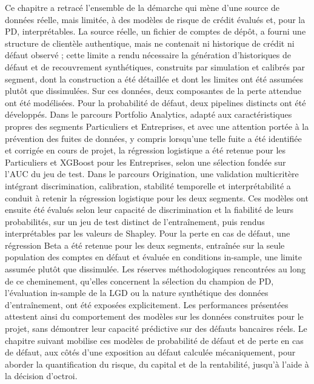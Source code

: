 Ce chapitre a retracé l'ensemble de la démarche qui mène d'une source de données réelle, mais limitée, à des modèles de risque de crédit évalués et, pour la PD, interprétables. La source réelle, un fichier de comptes de dépôt, a fourni une structure de clientèle authentique, mais ne contenait ni historique de crédit ni défaut observé ; cette limite a rendu nécessaire la génération d'historiques de défaut et de recouvrement synthétiques, construits par simulation et calibrés par segment, dont la construction a été détaillée et dont les limites ont été assumées plutôt que dissimulées. Sur ces données, deux composantes de la perte attendue ont été modélisées. Pour la probabilité de défaut, deux pipelines distincts ont été développés. Dans le parcours Portfolio Analytics, adapté aux caractéristiques propres des segments Particuliers et Entreprises, et avec une attention portée à la prévention des fuites de données, y compris lorsqu'une telle fuite a été identifiée et corrigée en cours de projet, la régression logistique a été retenue pour les Particuliers et XGBoost pour les Entreprises, selon une sélection fondée sur l'AUC du jeu de test. Dans le parcours Origination, une validation multicritère intégrant discrimination, calibration, stabilité temporelle et interprétabilité a conduit à retenir la régression logistique pour les deux segments. Ces modèles ont ensuite été évalués selon leur capacité de discrimination et la fiabilité de leurs probabilités, sur un jeu de test distinct de l'entraînement, puis rendus interprétables par les valeurs de Shapley. Pour la perte en cas de défaut, une régression Beta a été retenue pour les deux segments, entraînée sur la seule population des comptes en défaut et évaluée en conditions in-sample, une limite assumée plutôt que dissimulée. Les réserves méthodologiques rencontrées au long de ce cheminement, qu'elles concernent la sélection du champion de PD, l'évaluation in-sample de la LGD ou la nature synthétique des données d'entraînement, ont été exposées explicitement. Les performances présentées attestent ainsi du comportement des modèles sur les données construites pour le projet, sans démontrer leur capacité prédictive sur des défauts bancaires réels. Le chapitre suivant mobilise ces modèles de probabilité de défaut et de perte en cas de défaut, aux côtés d'une exposition au défaut calculée mécaniquement, pour aborder la quantification du risque, du capital et de la rentabilité, jusqu'à l'aide à la décision d'octroi.
